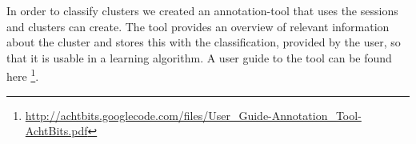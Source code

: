 In order to classify clusters we created an annotation-tool that uses the sessions and clusters can create. The tool provides an overview of relevant information about the cluster and stores this with the classification, provided by the user, so that it is usable in a learning algorithm. A user guide to the tool can be found here \footnote{\url{http://achtbits.googlecode.com/files/User_Guide-Annotation_Tool-AchtBits.pdf}}.